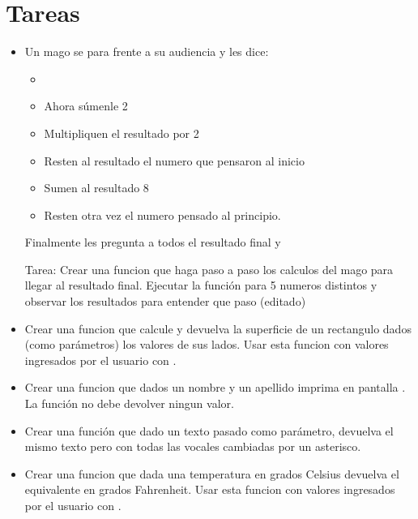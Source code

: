 \documentclass[a5paper,9pt,spanish]{sphinxmanual}
\begin{document}
\section{Tareas}
\label{\detokenize{fn:tareas}}\begin{itemize}
\item {} 
\sphinxAtStartPar
Un mago se para frente a su audiencia y les dice:
\begin{itemize}
\item {} 
\sphinxAtStartPar
{}

\item {} 
\sphinxAtStartPar
Ahora súmenle 2

\item {} 
\sphinxAtStartPar
Multipliquen el resultado por 2

\item {} 
\sphinxAtStartPar
Resten al resultado el numero que pensaron al inicio

\item {} 
\sphinxAtStartPar
Sumen al resultado 8

\item {} 
\sphinxAtStartPar
Resten otra vez el numero pensado al principio.

\end{itemize}

\sphinxAtStartPar
Finalmente les pregunta a todos el resultado final y 

\sphinxAtStartPar
Tarea:
Crear una funcion que haga paso a paso los calculos del mago para llegar al resultado final.
Ejecutar la función para 5 numeros distintos y observar los resultados para entender que paso (editado)

\item {} 
\sphinxAtStartPar
Crear una funcion que calcule y devuelva la superficie de un rectangulo
dados (como parámetros) los valores de sus lados. Usar esta funcion con
valores ingresados por el usuario con .

\item {} 
\sphinxAtStartPar
Crear una funcion que dados un nombre y un apellido imprima en pantalla
. La función no debe devolver ningun valor.

\item {} 
\sphinxAtStartPar
Crear una función que dado un texto pasado como parámetro, devuelva
el mismo texto pero con todas las vocales cambiadas por un asterisco.

\item {} 
\sphinxAtStartPar
Crear una funcion que dada una temperatura en grados Celsius devuelva
el equivalente en grados Fahrenheit. Usar esta funcion con
valores ingresados por el usuario con .

\end{itemize}
\end{document}

